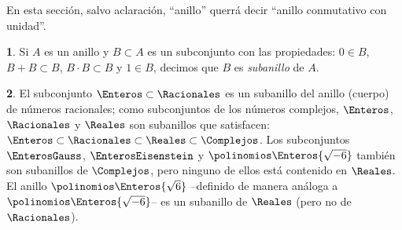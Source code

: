 \theoremstyle{plain}
\newtheorem{teoPolinomios}{\teoname}[section]
\newtheorem{coroPolinomios}[teoPolinomios]{\coroname}

\theoremstyle{definition}
\newtheorem{defPolinomios}[teoPolinomios]{}
\newtheorem{obsPolinomios}[teoPolinomios]{\obsname}
\newtheorem{ejemPolinomios}[teoPolinomios]{\ejemname}


En esta secci\'on, salvo aclaraci\'on, ``anillo'' querr\'a decir
``anillo conmutativo con unidad''.

\begin{defPolinomios}\label{def:polinomios:subanillo}
	Si $A$ es un anillo y $B\subset A$ es un subconjunto con las
	propiedades: $0\in B$, $B+B\subset B$, $B\cdot B\subset B$ y
	$1\in B$, decimos que $B$ es \emph{subanillo} de $A$.
\end{defPolinomios}

\begin{ejemPolinomios}\label{ejem:polinomios:subanillo}
	El subconjunto $\Enteros\subset\Racionales$ es un subanillo del
	anillo (cuerpo) de n\'umeros racionales; como subconjuntos de los
	n\'umeros complejos, $\Enteros$, $\Racionales$ y $\Reales$ son
	subanillos que satisfacen:
	$\Enteros\subset\Racionales\subset\Reales\subset\Complejos$.
	Los subconjuntos $\EnterosGauss$, $\EnterosEisenstein$ y
	$\polinomios\Enteros{\sqrt{-6}}$ tambi\'en son subanillos de
	$\Complejos$, pero ninguno de ellos est\'a contenido en $\Reales$.
	El anillo $\polinomios\Enteros{\sqrt 6}$ --definido de manera
	an\'aloga a $\polinomios\Enteros{\sqrt{-6}}$-- es un subanillo de
	$\Reales$ (pero no de $\Racionales$).
\end{ejemPolinomios}

